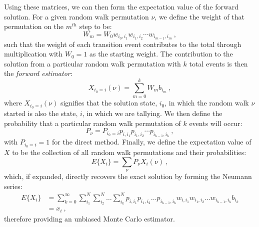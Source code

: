 Using these matrices, we can then form the expectation value of the
forward solution. For a given random walk permutation $\nu$, we define
the weight of that permutation on the $m^{th}$ step to be:
\begin{equation}
  W_{m} = W_0 w_{i_0,i_1} w_{i_1,i_2} \cdots w_{i_{m-1},i_m}\:,
  \label{eq:direct_permutation_weight}
\end{equation}
such that the weight of each transition event contributes to the total
through multiplication with $W_0 = 1$ as the starting weight. The
contribution to the solution from a particular random walk permutation
with $k$ total events is then the \textit{forward estimator}:
\begin{equation}
  X_{i_0 = i}(\nu) = \sum_{m=0}^k W_{m} b_{i_m}\:,
  \label{eq:direct_permutation_contribution}
\end{equation}
where $X_{i_0 = i}(\nu)$ signifies that the solution state, $i_0$, in
which the random walk $\nu$ started is also the state, $i$, in which
we are tallying. We then define the probability that a particular
random walk permutation of $k$ events will occur:
\begin{equation}
  P_{\nu} = P_{i_0=i} p_{i,i_1} p_{i_1,i_2} \cdots p_{i_{k-1},i_k}\:,
  \label{eq:direct_permutation_probability}
\end{equation}
with $P_{i_0=i} = 1$ for the direct method. Finally, we define the
expectation value of $X$ to be the collection of all random walk
permutations and their probabilities:
\begin{equation}
  E\{X_i\} = \sum_{\nu} P_{\nu} X_{i}(\nu)\:,
  \label{eq:direct_expectation_value}
\end{equation}
which, if expanded, directly recovers the exact solution by forming
the Neumann series:
\begin{equation}
  \begin{split}
    E\{X_i\}
    &=\sum_{k=0}^{\infty}\sum_{i_1}^{N}\sum_{i_2}^{N}\ldots
    \sum_{i_k}^{N} p_{i,i_1}p_{i_1,i_2}\ldots p_{i_{k-1},i_k}
    w_{i,i_1}w_{i_1,i_2}\ldots w_{i_{k-1},i_k} b_{i_k}\\ &= x_i\:,
  \end{split}
  \label{eq:direct_expectation_expansion}
\end{equation}
therefore providing an unbiased Monte Carlo estimator. 

